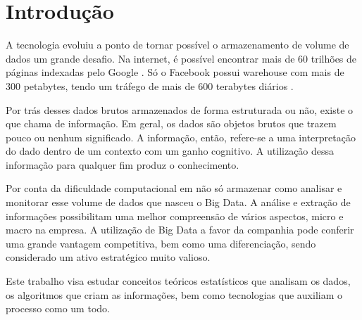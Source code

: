 \chapter*[Introdução]{Introdução}

A tecnologia evoluiu a ponto de tornar possível o armazenamento de volume de dados um grande desafio. Na internet, é possível encontrar mais de 60 trilhões de páginas indexadas pelo Google \cite{GOO01}. Só o Facebook possui warehouse com mais de 300 petabytes, tendo um tráfego de mais de 600 terabytes diários \cite{FAC01}.

Por trás desses dados brutos armazenados de forma estruturada ou não, existe o que  chama de informação. Em geral, os dados são objetos brutos que trazem pouco ou nenhum significado. A informação, então, refere-se a uma interpretação do dado dentro de um contexto com um ganho cognitivo. A utilização dessa informação para qualquer fim produz o conhecimento. 

Por conta da dificuldade computacional em não só armazenar como analisar e monitorar esse volume de dados que nasceu o Big Data. A análise e extração de informações possibilitam uma melhor compreensão de vários aspectos, micro e macro na empresa. A utilização de Big Data a favor da companhia pode conferir uma grande vantagem competitiva, bem como uma diferenciação, sendo considerado um ativo estratégico muito valioso.

Este trabalho visa estudar conceitos teóricos estatísticos que analisam os dados, os algoritmos que criam as informações, bem como tecnologias que auxiliam o processo como um todo.
